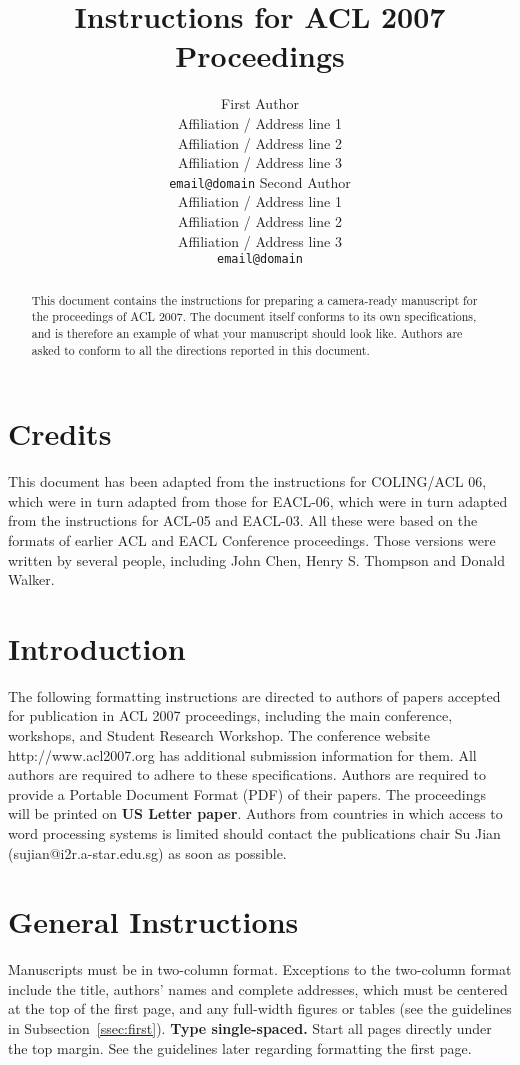 \documentclass[11pt]{article}
\title{Instructions for ACL 2007 Proceedings}
\author{First Author\\
  Affiliation / Address line 1\\
  Affiliation / Address line 2\\
  Affiliation / Address line 3\\
  {\tt email@domain}  \And
  Second Author\\
  Affiliation / Address line 1\\
  Affiliation / Address line 2\\
  Affiliation / Address line 3\\
  {\tt email@domain}}
\date{}
\begin{document}
\maketitle
\begin{abstract}
  This document contains the instructions for preparing a camera-ready
  manuscript for the proceedings of ACL 2007. The document itself
  conforms to its own specifications, and is therefore an example of
  what your manuscript should look like. Authors are asked to conform
  to all the directions reported in this document.
\end{abstract}

\section{Credits}

This document has been adapted from the instructions for COLING/ACL
06, which were in turn adapted from those for EACL-06, which were in
turn adapted from the instructions for ACL-05 and EACL-03.  All these
were based on the formats of earlier ACL and EACL Conference
proceedings. Those versions were written by several people, including
John Chen, Henry S. Thompson and Donald Walker.

\section{Introduction}

The following formatting instructions are directed to authors of
papers accepted for publication in ACL 2007 proceedings, including
the main conference, workshops, and Student Research Workshop. The
conference website http://www.acl2007.org has additional submission
information for them.  All authors are required to adhere to these
specifications. Authors are required to provide a Portable Document
Format (PDF) of their papers. The proceedings will be printed on
{\bf US Letter paper}. Authors from countries in which access to
word processing systems is limited should contact the publications
chair Su Jian (sujian@i2r.a-star.edu.sg) as soon as possible.

\section{General Instructions}

Manuscripts must be in two-column format.  Exceptions to the
two-column format include the title, authors' names and complete
addresses, which must be centered at the top of the first page, and
any full-width figures or tables (see the guidelines in
Subsection~\ref{ssec:first}). {\bf Type single-spaced.}  Start all
pages directly under the top margin. See the guidelines later
regarding formatting the first page.
\end{document}
